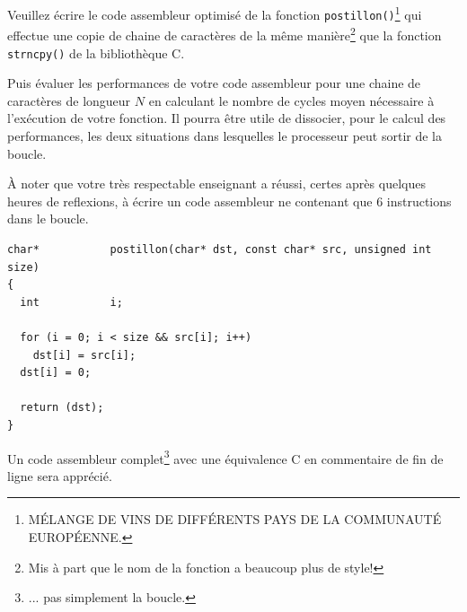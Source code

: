 Veuillez \'ecrire le code assembleur optimis\'e de la fonction
\texttt{postillon()}\footnote{M\'ELANGE DE VINS DE DIFF\'ERENTS
                     PAYS DE LA COMMUNAUT\'E EUROP\'EENNE.}
qui effectue une copie de chaine de caract\`eres de la m\^eme
mani\`ere\footnote{Mis \`a part que le nom de la fonction a
                   beaucoup plus de style!}
que la fonction \texttt{strncpy()} de la biblioth\`eque C.

Puis \'evaluer les performances de votre code assembleur pour une chaine
de caract\`eres de longueur $N$ en calculant le nombre de cycles moyen
n\'ecessaire \`a l'ex\'ecution de votre fonction. Il pourra \^etre utile
de dissocier, pour le calcul des performances, les deux situations dans
lesquelles le processeur peut sortir de la boucle.

\`A noter que votre tr\`es respectable enseignant a r\'eussi, certes apr\`es
quelques heures de reflexions, \`a \'ecrire un code assembleur ne contenant que
$6$ instructions dans le boucle.

\begin{verbatim}
char*           postillon(char* dst, const char* src, unsigned int size)
{
  int           i;

  for (i = 0; i < size && src[i]; i++)
    dst[i] = src[i];
  dst[i] = 0;

  return (dst);
}
\end{verbatim}

Un code assembleur complet\footnote{... pas simplement la boucle.} avec une
\'equivalence C en commentaire de fin de ligne sera appr\'eci\'e.

